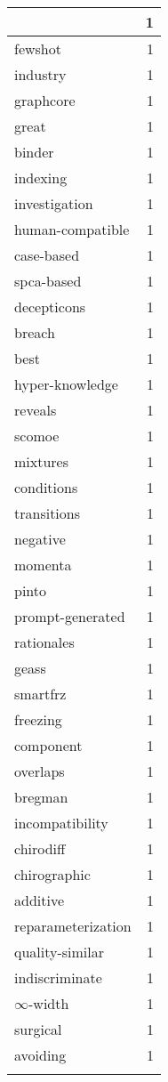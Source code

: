 \begin{table}[h]
\begin{tabular}{|l|r|}
{\hline
model-level & 1 \\
\hline
fewshot & 1 \\
\hline
industry & 1 \\
\hline
graphcore & 1 \\
\hline
great & 1 \\
\hline
binder & 1 \\
\hline
indexing & 1 \\
\hline
investigation & 1 \\
\hline
human-compatible & 1 \\
\hline
case-based & 1 \\
\hline
spca-based & 1 \\
\hline
decepticons & 1 \\
\hline
breach & 1 \\
\hline
best & 1 \\
\hline
hyper-knowledge & 1 \\
\hline
reveals & 1 \\
\hline
scomoe & 1 \\
\hline
mixtures & 1 \\
\hline
conditions & 1 \\
\hline
transitions & 1 \\
\hline
negative & 1 \\
\hline
momenta & 1 \\
\hline
pinto & 1 \\
\hline
prompt-generated & 1 \\
\hline
rationales & 1 \\
\hline
geass & 1 \\
\hline
smartfrz & 1 \\
\hline
freezing & 1 \\
\hline
component & 1 \\
\hline
overlaps & 1 \\
\hline
bregman & 1 \\
\hline
incompatibility & 1 \\
\hline
chirodiff & 1 \\
\hline
chirographic & 1 \\
\hline
additive & 1 \\
\hline
reparameterization & 1 \\
\hline
quality-similar & 1 \\
\hline
indiscriminate & 1 \\
\hline
$\infty$-width & 1 \\
\hline
surgical & 1 \\
\hline
avoiding & 1 \\
}
\end{tabular}
\end{table}
